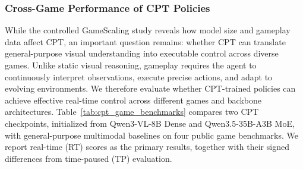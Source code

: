 \subsubsection{Cross-Game Performance of CPT Policies}


While the controlled GameScaling study reveals how model size and gameplay data affect CPT, an important question remains: whether CPT can translate general-purpose visual understanding into executable control across diverse games. Unlike static visual reasoning, gameplay requires the agent to continuously interpret observations, execute precise actions, and adapt to evolving environments. We therefore evaluate whether CPT-trained policies can achieve effective real-time control across different games and backbone architectures. Table~\ref{tab:cpt_game_benchmarks} compares two CPT checkpoints, initialized from Qwen3-VL-8B Dense and Qwen3.5-35B-A3B MoE, with general-purpose multimodal baselines on four public game benchmarks. We report real-time (RT) scores as the primary results, together with their signed differences from time-paused (TP) evaluation.


